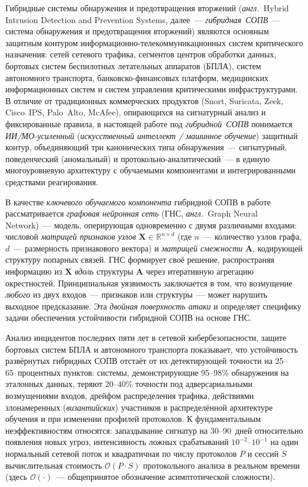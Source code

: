 \documentclass[12pt,a5paper]{article}
\begin{document}
Гибридные системы обнаружения и предотвращения вторжений
(\emph{англ.}~Hybrid Intrusion Detection and Prevention Systems,
далее~--- \emph{гибридная~СОПВ}~--- система обнаружения и
предотвращения вторжений) являются основным защитным контуром
информационно-телекоммуникационных систем критического
назначения: сетей сетевого трафика, сегментов центров обработки
данных, бортовых систем беспилотных летательных аппаратов
(БПЛА), систем автономного транспорта, банковско-финансовых
платформ, медицинских информационных систем и систем
управления критическими инфраструктурами. В отличие от
традиционных коммерческих продуктов (Snort, Suricata, Zeek,
Cisco~IPS, Palo~Alto, McAfee), опирающихся на сигнатурный
анализ и фиксированные правила, в настоящей работе под
\emph{гибридной~СОПВ} понимается \emph{ИИ/МО-усиленный}
(\emph{искусственный интеллект / машинное обучение})
защитный контур, объединяющий три канонических типа
обнаружения~--- сигнатурный, поведенческий (аномальный) и
протокольно-аналитический~--- в единую многоуровневую
архитектуру с обучаемыми компонентами и интегрированными
средствами реагирования.

В качестве \emph{ключевого обучаемого компонента} гибридной
СОПВ в работе рассматривается \emph{графовая нейронная сеть}
(ГНС, \emph{англ.}~Graph Neural Network)~--- модель,
оперирующая одновременно с двумя различными входами:
числовой \emph{матрицей признаков узлов}
$\mathbf{X}\in\mathbb{R}^{n\times d}$ (где $n$~--- количество
узлов графа, $d$~--- размерность признакового вектора) и
\emph{матрицей смежности} $\mathbf{A}$, кодирующей структуру
попарных связей. ГНС формирует своё решение, распространяя
информацию из $\mathbf{X}$ \emph{вдоль} структуры $\mathbf{A}$
через итеративную агрегацию окрестностей. Принципиальная
уязвимость заключается в том, что возмущение \emph{любого}
из двух входов~--- признаков или структуры~--- может нарушить
выходное предсказание. Эта \emph{двойная поверхность атаки}
и определяет специфику задачи обеспечения устойчивости
гибридной СОПВ на основе ГНС.

Анализ инцидентов последних пяти лет в сетевой
кибербезопасности, защите бортовых систем БПЛА и автономного
транспорта показывает, что устойчивость развёрнутых
гибридных СОПВ отстаёт от их детектирующей точности на
25--65~процентных пунктов: системы, демонстрирующие 95--98\%
обнаружения на эталонных данных, теряют 20--40\% точности под
адверсариальными возмущениями входов, дрейфом распределения
трафика, действиями злонамеренных (\emph{византийских})
участников в распределённой архитектуре обучения и при
изменении профилей протоколов. К фундаментальным
неэффективностям относятся: запаздывание сигнатур на
30--90~дней относительно появления новых угроз, интенсивность
ложных срабатываний $10^{-2}$--$10^{-1}$ на один нормальный
сетевой поток и квадратичная по числу протоколов $P$ и
сессий $S$ вычислительная стоимость
$\mathcal{O}(P\cdot S)$ протокольного анализа в реальном
времени (здесь $\mathcal{O}(\cdot)$~--- общепринятое
обозначение асимптотической сложности).
\end{document}
